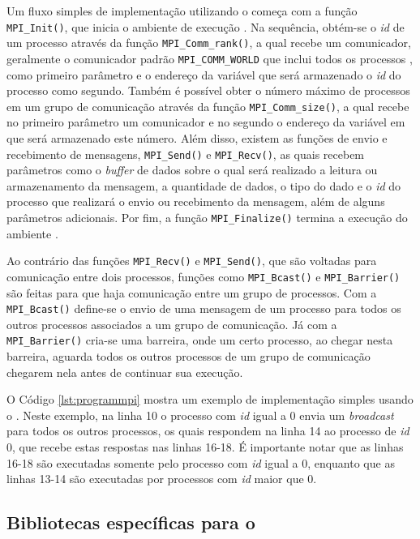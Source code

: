 Um fluxo simples de implementação utilizando o \MPI começa com a função \texttt{MPI\_Init()}, que inicia o ambiente de execução \MPI. Na sequência, obtém-se o \textit{id} de um processo através da função \texttt{MPI\_Comm\_rank()}, a qual recebe um comunicador, geralmente o comunicador padrão \texttt{MPI\_COMM\_WORLD} que inclui todos os processos \MPI, como primeiro parâmetro e o endereço da variável que será armazenado o \textit{id} do processo como segundo. Também é possível obter o número máximo de processos em um grupo de comunicação através da função \texttt{MPI\_Comm\_size()}, a qual recebe no primeiro parâmetro um comunicador e no segundo o endereço da variável em que será armazenado este número. Além disso, existem as funções de envio e recebimento de mensagens, \texttt{MPI\_Send()} e \texttt{MPI\_Recv()}, as quais recebem parâmetros como o \textit{buffer} de dados sobre o qual será realizado a leitura ou armazenamento da mensagem, a quantidade de dados, o tipo do dado e o \textit{id} do processo que realizará o envio ou recebimento da mensagem, além de alguns parâmetros adicionais. Por fim, a função \texttt{MPI\_Finalize()} termina a execução do ambiente \MPI.

Ao contrário das funções \texttt{MPI\_Recv()} e \texttt{MPI\_Send()}, que são voltadas para comunicação entre dois processos, funções como \texttt{MPI\_Bcast()} e \texttt{MPI\_Barrier()} são feitas para que haja comunicação entre um grupo de processos. Com a \texttt{MPI\_Bcast()} define-se o envio de uma mensagem de um processo para todos os outros processos associados a um grupo de comunicação. Já com a \texttt{MPI\_Barrier()} cria-se uma barreira, onde um certo processo, ao chegar nesta barreira, aguarda todos os outros processos de um grupo de comunicação chegarem nela antes de continuar sua execução.

O Código \ref{lst:programmpi} mostra um exemplo de implementação simples usando o \MPI. Neste exemplo, na linha 10 o processo com \textit{id} igual a 0 envia um \textit{broadcast} para todos os outros processos, os quais respondem na linha 14 ao processo de \textit{id} 0, que recebe estas respostas nas linhas 16-18. É importante notar que as linhas 16-18 são executadas somente pelo processo com \textit{id} igual a 0, enquanto que as linhas 13-14 são executadas por processos com \textit{id} maior que 0.

\subsection{Bibliotecas específicas para o \mppa}
\label{sec:bibliotecasespecificasmppa}

